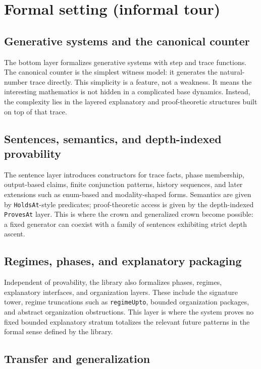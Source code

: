 \documentclass[11pt,a4paper]{article}
\theoremstyle{definition}
\begin{document}
\section{Formal setting (informal tour)}\label{sec:formal-overview}

\subsection{Generative systems and the canonical counter}

The bottom layer formalizes generative systems with step and trace functions. The canonical counter is the simplest witness model: it generates the natural-number trace directly. This simplicity is a feature, not a weakness. It means the interesting mathematics is not hidden in a complicated base dynamics. Instead, the complexity lies in the layered explanatory and proof-theoretic structures built on top of that trace.

\subsection{Sentences, semantics, and depth-indexed provability}

The sentence layer introduces constructors for trace facts, phase membership, output-based claims, finite conjunction patterns, history sequences, and later extensions such as enum-based and modality-shaped forms. Semantics are given by \texttt{HoldsAt}-style predicates; proof-theoretic access is given by the depth-indexed \texttt{ProvesAt} layer. This is where the crown and generalized crown become possible: a fixed generator can coexist with a family of sentences exhibiting strict depth ascent.

\subsection{Regimes, phases, and explanatory packaging}

Independent of provability, the library also formalizes phases, regimes, explanatory interfaces, and organization layers. These include the signature tower, regime truncations such as \texttt{regimeUpto}, bounded organization packages, and abstract organization obstructions. This layer is where the system proves no fixed bounded explanatory stratum totalizes the relevant future patterns in the formal sense defined by the library.

\subsection{Transfer and generalization}
\end{document}
